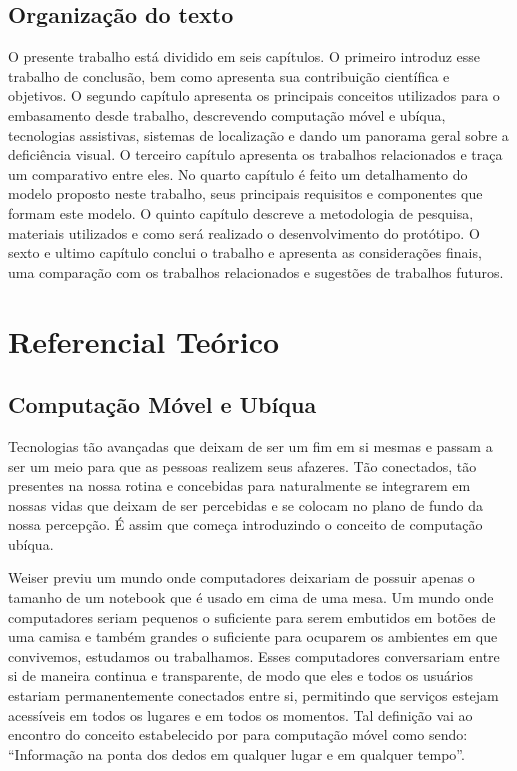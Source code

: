 \documentclass[english,brazilian]{UNISINOSmonografia}
\begin{document}
	\section{Organização do texto}
O presente trabalho está dividido em seis capítulos. O primeiro introduz esse trabalho de conclusão, bem como apresenta sua contribuição científica e objetivos.
O segundo capítulo apresenta os principais conceitos utilizados para o embasamento desde trabalho, descrevendo computação móvel e ubíqua, tecnologias assistivas, sistemas de localização e dando um panorama geral sobre a deficiência visual.
O terceiro capítulo apresenta os trabalhos relacionados e traça um comparativo entre eles.
No quarto capítulo é feito um detalhamento do modelo proposto neste trabalho, seus principais requisitos e componentes que formam este modelo.
O quinto capítulo descreve a metodologia de pesquisa, materiais utilizados e como será realizado o desenvolvimento do protótipo.
O sexto e ultimo capítulo conclui o trabalho e apresenta as considerações finais, uma comparação com os trabalhos relacionados e sugestões de trabalhos futuros.

\chapter{Referencial Teórico}

	\section{Computação Móvel e Ubíqua}
Tecnologias tão avançadas que deixam de ser um fim em si mesmas e passam a ser um meio para que as pessoas realizem seus afazeres. Tão conectados, tão presentes na nossa rotina e concebidas para naturalmente se integrarem em nossas vidas que deixam de ser percebidas e se colocam no plano de fundo da nossa percepção. É assim que  começa introduzindo o conceito de computação ubíqua. 

Weiser previu um mundo onde computadores deixariam de possuir apenas o tamanho de um notebook que é usado em cima de uma mesa. Um mundo onde computadores seriam pequenos o suficiente para serem embutidos em botões de uma camisa e também grandes o suficiente para ocuparem os ambientes em que convivemos, estudamos ou trabalhamos. Esses computadores conversariam entre si de maneira continua e transparente, de modo que eles e todos os usuários estariam permanentemente conectados entre si, permitindo que serviços estejam acessíveis em todos os lugares e em todos os momentos. Tal definição vai ao encontro do conceito estabelecido por  para computação móvel como sendo: “Informação na ponta dos dedos em qualquer lugar e em qualquer tempo”.
	
\end{document}
